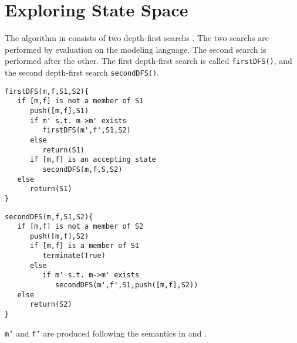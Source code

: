 \documentclass[12pt,a4paper,titlepage]{article}
\theoremstyle{break}
\begin{document}
\section{Exploring State Space}
The algorithm in \NHK consists of two depth-first searchs \cite{Courcoubetis:1991}.
The two searchs are performed by evaluation on the modeling language.
The second search is performed after the other.
The first depth-first search is called {\tt firstDFS()}, and the second depth-first search {\tt secondDFS()}.
  \begin{center}
    \begin{lstlisting}[caption=FirstDFS]
firstDFS(m,f,S1,S2){
   if [m,f] is not a member of S1
      push([m,f],S1)
      if m' s.t. m->m' exists
         firstDFS(m',f',S1,S2)
      else
         return(S1)
      if [m,f] is an accepting state
         secondDFS(m,f,S,S2)
   else
      return(S1)
}
    \end{lstlisting}
  \end{center}
  \begin{center}
    \begin{lstlisting}[caption=SecondDFS]
secondDFS(m,f,S1,S2){
   if [m,f] is not a member of S2
      push([m,f],S2)
      if [m,f] is a member of S1
         terminate(True)
      else
         if m' s.t. m->m' exists
            secondDFS(m',f',S1,push([m,f],S2))
   else
      return(S2)
}
    \end{lstlisting}
  \end{center}
{\tt m'} and {\tt f'} are produced following the semantics in  and .

%
%


\end{document}
